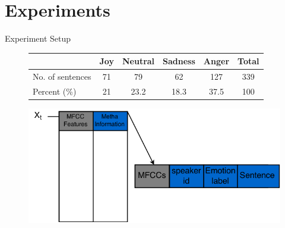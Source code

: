 \section{Experiments}
	\begin{frame}[t]{Experiment Setup}
	  \begin{figure}
		    \begin{tabular}{l|*{4}{c}|c}
			  & Joy & Neutral & Sadness & Anger & Total\\
			\hline
			No. of sentences &71	&79	&62	&127 & 339\\
			\hline
		    Percent (\%) &21 & 23.2 & 18.3& 37.5 & 100
		    \end{tabular}
	  \end{figure}
	  \begin{figure}
	   \includegraphics[scale=0.3]{DataStruct.png}
	  \end{figure}
	\end{frame}

